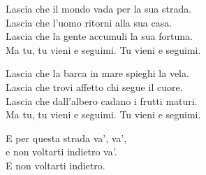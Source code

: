 
\strofa Lascia che il mondo vada per la sua strada.\\
Lascia che l'uomo ritorni alla sua casa.\\
Lascia che la gente accumuli la sua fortuna.\\
Ma tu, tu vieni e seguimi. Tu vieni e seguimi.

\spazio

\strofa Lascia che la barca in mare spieghi la vela.\\
Lascia che trovi affetto chi segue il cuore.\\
Lascia che dall'albero cadano i frutti maturi.\\
Ma tu, tu vieni e seguimi. Tu vieni e seguimi.

\spazio

 

\spazio

E per questa strada va', va',\\
e non voltarti indietro va'.\\
E non voltarti indietro.